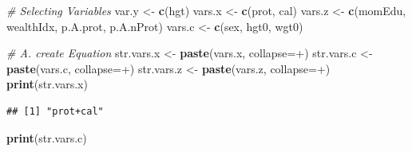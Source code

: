 \documentclass[
]{book}
\newenvironment{Shaded}{\begin{snugshade}}{\end{snugshade}}
\newcommand{\CommentTok}[1]{\textcolor[rgb]{0.56,0.35,0.01}{\textit{#1}}}
\newcommand{\DataTypeTok}[1]{\textcolor[rgb]{0.13,0.29,0.53}{#1}}
\newcommand{\KeywordTok}[1]{\textcolor[rgb]{0.13,0.29,0.53}{\textbf{#1}}}
\newcommand{\NormalTok}[1]{#1}
\newcommand{\StringTok}[1]{\textcolor[rgb]{0.31,0.60,0.02}{#1}}
\begin{document}
\begin{Shaded}
\begin{Highlighting}[]
\CommentTok{\# Selecting Variables}
\NormalTok{var.y \textless{}{-}}\StringTok{ }\KeywordTok{c}\NormalTok{(}\StringTok{\textquotesingle{}hgt\textquotesingle{}}\NormalTok{)}
\NormalTok{vars.x \textless{}{-}}\StringTok{ }\KeywordTok{c}\NormalTok{(}\StringTok{\textquotesingle{}prot\textquotesingle{}}\NormalTok{, }\StringTok{\textquotesingle{}cal\textquotesingle{}}\NormalTok{)}
\NormalTok{vars.z \textless{}{-}}\StringTok{ }\KeywordTok{c}\NormalTok{(}\StringTok{\textquotesingle{}momEdu\textquotesingle{}}\NormalTok{, }\StringTok{\textquotesingle{}wealthIdx\textquotesingle{}}\NormalTok{, }\StringTok{\textquotesingle{}p.A.prot\textquotesingle{}}\NormalTok{, }\StringTok{\textquotesingle{}p.A.nProt\textquotesingle{}}\NormalTok{)}
\NormalTok{vars.c \textless{}{-}}\StringTok{ }\KeywordTok{c}\NormalTok{(}\StringTok{\textquotesingle{}sex\textquotesingle{}}\NormalTok{, }\StringTok{\textquotesingle{}hgt0\textquotesingle{}}\NormalTok{, }\StringTok{\textquotesingle{}wgt0\textquotesingle{}}\NormalTok{)}
\end{Highlighting}
\end{Shaded}

\begin{Shaded}
\begin{Highlighting}[]
\CommentTok{\# A. create Equation}
\NormalTok{str.vars.x \textless{}{-}}\StringTok{ }\KeywordTok{paste}\NormalTok{(vars.x, }\DataTypeTok{collapse=}\StringTok{\textquotesingle{}+\textquotesingle{}}\NormalTok{)}
\NormalTok{str.vars.c \textless{}{-}}\StringTok{ }\KeywordTok{paste}\NormalTok{(vars.c, }\DataTypeTok{collapse=}\StringTok{\textquotesingle{}+\textquotesingle{}}\NormalTok{)}
\NormalTok{str.vars.z \textless{}{-}}\StringTok{ }\KeywordTok{paste}\NormalTok{(vars.z, }\DataTypeTok{collapse=}\StringTok{\textquotesingle{}+\textquotesingle{}}\NormalTok{)}
\KeywordTok{print}\NormalTok{(str.vars.x)}
\end{Highlighting}
\end{Shaded}

\begin{verbatim}
## [1] "prot+cal"
\end{verbatim}

\begin{Shaded}
\begin{Highlighting}[]
\KeywordTok{print}\NormalTok{(str.vars.c)}
\end{Highlighting}
\end{Shaded}
\end{document}
